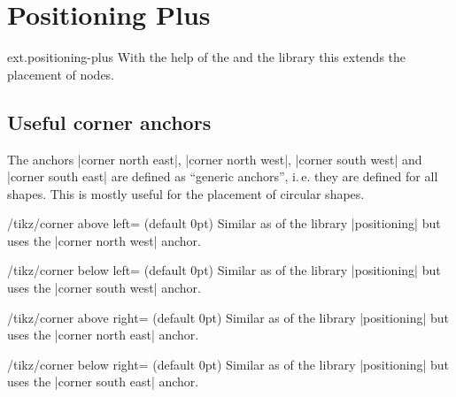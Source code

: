 %
%
%
\clearpage
\section{Positioning Plus}
\label{library:positioning-plus}
\begin{tikzlibrary}{ext.positioning-plus}
  With the help of the  and the  library this extends the placement of nodes.
\end{tikzlibrary}

\subsection{Useful corner anchors}
The anchors |corner north east|, |corner north west|, |corner south west| and |corner south east|
are defined as ``generic anchors'', i.\,e. they are defined for all shapes.
This is mostly useful for the placement of circular shapes.
\begin{stylekey}{/tikz/corner above left= (default 0pt)}
  Similar as  of the \tikzname\space library |positioning|
  but uses the |corner north west| anchor.
\end{stylekey}
\begin{stylekey}{/tikz/corner below left= (default 0pt)}
  Similar as  of the \tikzname\space library |positioning|
  but uses the |corner south west| anchor.
\end{stylekey}
\begin{stylekey}{/tikz/corner above right= (default 0pt)}
  Similar as  of the \tikzname\space library |positioning|
  but uses the |corner north east| anchor.
\end{stylekey}
\begin{stylekey}{/tikz/corner below right= (default 0pt)}
  Similar as  of the \tikzname\space library |positioning|
  but uses the |corner south east| anchor.
\end{stylekey}

